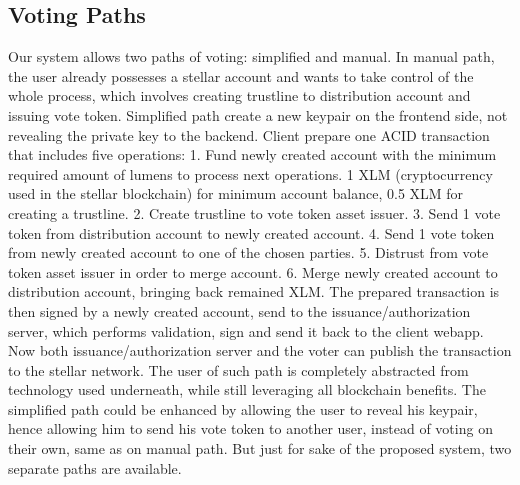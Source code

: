 \documentclass[runningheads]{llncs}
\begin{document}


\subsection{Voting Paths}
Our system allows two paths of voting: simplified and manual. In manual path, the user already possesses a stellar account and wants to take control of the whole process, which involves creating trustline to distribution account and issuing vote token. Simplified path create a new keypair on the frontend side, not revealing the private key to the backend. Client prepare one ACID transaction that includes five operations:
1. Fund newly created account with the minimum required amount of lumens to process next operations. 1 XLM (cryptocurrency used in the stellar blockchain) for minimum account balance, 0.5 XLM for creating a trustline.
2. Create trustline to vote token asset issuer.
3. Send 1 vote token from distribution account to newly created account.
4. Send 1 vote token from newly created account to one of the chosen parties.
5. Distrust from vote token asset issuer in order to merge account.
6. Merge newly created account to distribution account, bringing back
remained XLM.
The prepared transaction is then signed by a newly created account, send to the issuance/authorization server, which performs validation, sign and send it back to the client webapp. Now both issuance/authorization server and the voter can publish the transaction to the stellar network. The user of such path is completely abstracted from technology used underneath, while still leveraging all blockchain benefits. The simplified path could be enhanced by allowing the user to reveal his keypair, hence allowing him to send his vote token to another user, instead of voting on their own, same as on manual path. But just for sake of the proposed system, two separate paths are available.
\end{document}
